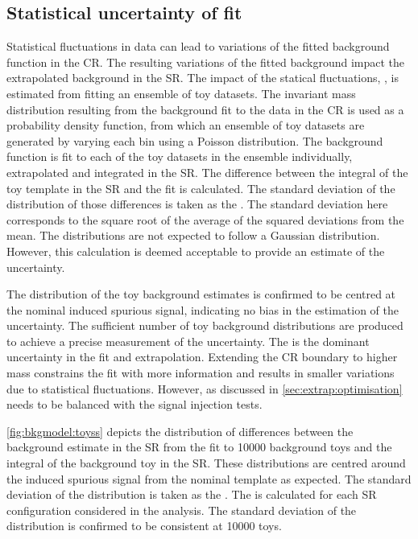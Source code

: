 \subsection{Statistical uncertainty of fit}\label{sec:uncertBkgmodel:statu}
Statistical fluctuations in data can lead to variations of the fitted background function in the CR. The resulting variations of the fitted background impact the extrapolated background in the SR. The impact of the statical fluctuations, \STATU, is estimated from fitting an ensemble of toy datasets. The invariant mass distribution resulting from the background fit to the data in the CR is used as a probability density function, from which an ensemble of toy datasets are generated by varying each bin using a Poisson distribution. The background function is fit to each of the toy datasets in the ensemble individually, extrapolated and integrated in the SR. The difference between the integral of the toy template in the SR and the fit is calculated. The standard deviation of the distribution of those differences is taken as the \STATU. The standard deviation here corresponds to  the square root of the average of the squared deviations from the mean. The distributions are not expected to follow a Gaussian distribution. However, this calculation is deemed acceptable to provide an estimate of the uncertainty.

The distribution of the toy background estimates is confirmed to be centred at the nominal induced spurious signal, indicating no bias in the estimation of the uncertainty. The sufficient number of toy background distributions are produced to achieve a precise measurement of the uncertainty. The \STATU is the dominant uncertainty in the fit and extrapolation. Extending the CR boundary to higher mass constrains the fit with more information and results in smaller variations due to statistical fluctuations. However, as discussed in \cref{sec:extrap:optimisation} needs to be balanced with the signal injection tests.

\cref{fig:bkgmodel:toyss} depicts the distribution of differences between the background estimate in the SR from the fit to 10000 background toys and the integral of the background toy in the SR. These distributions are centred around the induced spurious signal from the nominal template as expected. The standard deviation of the distribution is taken as the \STATU. The \ISSU is calculated for each SR configuration considered in the analysis. The standard deviation of the distribution is confirmed to be consistent at 10000 toys. 

